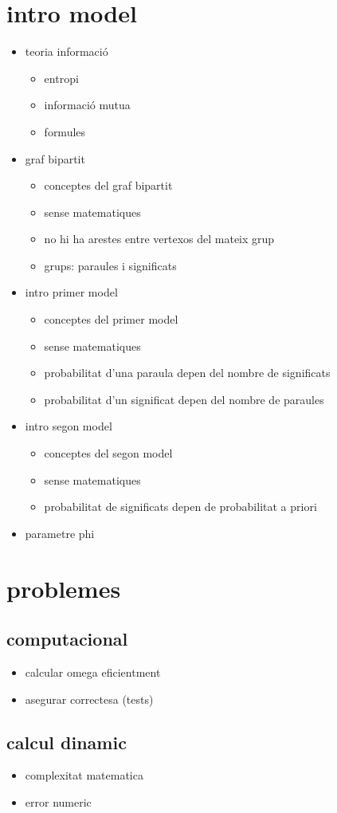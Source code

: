 \section{intro model}
\begin{itemize}
\item teoria informació
  \begin{itemize}
  \item entropi
  \item informació mutua
  \item formules
  \end{itemize}
\item graf bipartit
  \begin{itemize}
  \item conceptes del graf bipartit
  \item sense matematiques
  \item no hi ha arestes entre vertexos del mateix grup
  \item grups: paraules i significats
  \end{itemize}
\item intro primer model
  \begin{itemize}
  \item conceptes del primer model
  \item sense matematiques
  \item probabilitat d'una paraula depen del nombre de significats
  \item probabilitat d'un significat depen del nombre de paraules
  \end{itemize}
\item intro segon model
  \begin{itemize}
  \item conceptes del segon model
  \item sense matematiques
  \item probabilitat de significats depen de probabilitat a priori
  \end{itemize}
\item parametre phi
\end{itemize}
\section{problemes}
\subsection{computacional}
\begin{itemize}
\item calcular omega eficientment
\item asegurar correctesa (tests)
\end{itemize}
\subsection{calcul dinamic}
\begin{itemize}
\item complexitat matematica
\item error numeric
\end{itemize}

